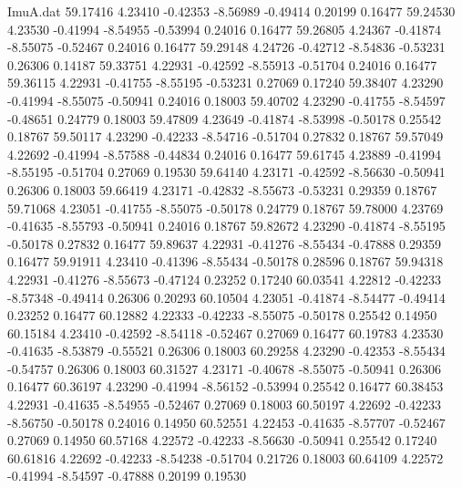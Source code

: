 \begin{filecontents}{ImuA.dat}
  59.17416    4.23410   -0.42353   -8.56989   -0.49414    0.20199    0.16477
  59.24530    4.23530   -0.41994   -8.54955   -0.53994    0.24016    0.16477
  59.26805    4.24367   -0.41874   -8.55075   -0.52467    0.24016    0.16477
  59.29148    4.24726   -0.42712   -8.54836   -0.53231    0.26306    0.14187
  59.33751    4.22931   -0.42592   -8.55913   -0.51704    0.24016    0.16477
  59.36115    4.22931   -0.41755   -8.55195   -0.53231    0.27069    0.17240
  59.38407    4.23290   -0.41994   -8.55075   -0.50941    0.24016    0.18003
  59.40702    4.23290   -0.41755   -8.54597   -0.48651    0.24779    0.18003
  59.47809    4.23649   -0.41874   -8.53998   -0.50178    0.25542    0.18767
  59.50117    4.23290   -0.42233   -8.54716   -0.51704    0.27832    0.18767
  59.57049    4.22692   -0.41994   -8.57588   -0.44834    0.24016    0.16477
  59.61745    4.23889   -0.41994   -8.55195   -0.51704    0.27069    0.19530
  59.64140    4.23171   -0.42592   -8.56630   -0.50941    0.26306    0.18003
  59.66419    4.23171   -0.42832   -8.55673   -0.53231    0.29359    0.18767
  59.71068    4.23051   -0.41755   -8.55075   -0.50178    0.24779    0.18767
  59.78000    4.23769   -0.41635   -8.55793   -0.50941    0.24016    0.18767
  59.82672    4.23290   -0.41874   -8.55195   -0.50178    0.27832    0.16477
  59.89637    4.22931   -0.41276   -8.55434   -0.47888    0.29359    0.16477
  59.91911    4.23410   -0.41396   -8.55434   -0.50178    0.28596    0.18767
  59.94318    4.22931   -0.41276   -8.55673   -0.47124    0.23252    0.17240
  60.03541    4.22812   -0.42233   -8.57348   -0.49414    0.26306    0.20293
  60.10504    4.23051   -0.41874   -8.54477   -0.49414    0.23252    0.16477
  60.12882    4.22333   -0.42233   -8.55075   -0.50178    0.25542    0.14950
  60.15184    4.23410   -0.42592   -8.54118   -0.52467    0.27069    0.16477
  60.19783    4.23530   -0.41635   -8.53879   -0.55521    0.26306    0.18003
  60.29258    4.23290   -0.42353   -8.55434   -0.54757    0.26306    0.18003
  60.31527    4.23171   -0.40678   -8.55075   -0.50941    0.26306    0.16477
  60.36197    4.23290   -0.41994   -8.56152   -0.53994    0.25542    0.16477
  60.38453    4.22931   -0.41635   -8.54955   -0.52467    0.27069    0.18003
  60.50197    4.22692   -0.42233   -8.56750   -0.50178    0.24016    0.14950
  60.52551    4.22453   -0.41635   -8.57707   -0.52467    0.27069    0.14950
  60.57168    4.22572   -0.42233   -8.56630   -0.50941    0.25542    0.17240
  60.61816    4.22692   -0.42233   -8.54238   -0.51704    0.21726    0.18003
  60.64109    4.22572   -0.41994   -8.54597   -0.47888    0.20199    0.19530

\end{filecontents}
